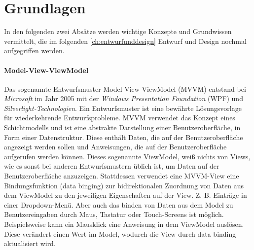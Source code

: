\documentclass[notables, nomenclature, oneside, 150]{HSMW-Thesis}
\begin{document}
	\section{Grundlagen}
			In den folgenden zwei Absätze werden wichtige Konzepte und Grundwissen vermittelt, die im folgenden \autoref{ch:entwurfunddesign} Entwurf und Design nochmal aufgegriffen werden.

		\paragraph*{Model-View-ViewModel}
			Das sogenannte Entwurfsmuster Model View ViewModel (MVVM) entstand bei \textit{Microsoft} im Jahr 2005 mit der \textit{Windows Presentation Foundation} (WPF) und \textit{Silverlight-Technologien}. Ein Entwurfsmuster ist eine bewährte Lösungsvorlage für wiederkehrende Entwurfsprobleme. MVVM verwendet das Konzept eines Schichtmodells und ist eine abstrakte Darstellung einer Benutzeroberfläche, in Form einer Datenstruktur. Diese enthält Daten, die auf der Benutzeroberfläche angezeigt werden sollen und Anweisungen, die auf der Benutzeroberfläche aufgerufen werden können. Dieses sogenannte ViewModel, weiß nichts von Views, wie es sonst bei anderen Entwurfsmustern üblich ist, um Daten auf der Benutzeroberfläche anzuzeigen. Stattdessen verwendet eine MVVM-View eine Bindungsfunktion (data binging) zur bidirektionalen Zuordnung von Daten aus dem ViewModel zu den jeweiligen Eigenschaften auf der View. Z. B. Einträge in einer Dropdown-Menü. Aber auch das binden von Daten aus dem Model zu Benutzereingaben durch Maus, Tastatur oder Touch-Screens ist möglich. Beispielsweise kann ein Mausklick eine Anweisung in dem ViewModel auslösen. Diese verändert einen Wert im Model, wodurch die View durch data binding aktualisiert wird. \cite{papa_fundamental_2011} \cite{freeman_pro_2017} \cite{bragge_model-view-controller_2013}
\end{document}
